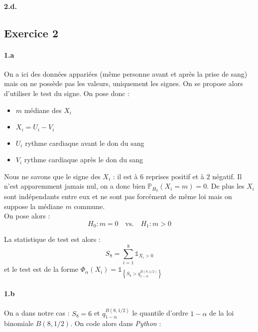 \documentclass[a4paper,10pt]{report}
\begin{document}

\paragraph{2.d.} %






\subsection*{Exercice 2}


\paragraph{1.a} On a ici des données appariées (même personne avant et après la prise de sang) mais on ne possède pas les valeurs, uniquement les signes. On se propose alors d'utiliser le test du signe. On pose donc :
\begin{itemize}
\item $m$ médiane des $X_i$
\item $X_i = U_i - V_i$
\item $U_i$ rythme cardiaque avant le don du sang
\item $V_i$ rythme cardiaque après le don du sang
\end{itemize}
Nous ne savons que le signe des $X_i$ : il est à $6$ reprises positif et à $2$ négatif. Il n'est apparemment jamais nul, on a donc bien $\mathbb{P}_{H_0}(X_i=m)=0$. De plus les $X_i$ sont indépendants entre eux et ne sont pas forcément de même loi mais on suppose la médiane $m$ commune. \\
On pose alors :
$$
H_0 : m=0 \quad \text{vs.} \quad H_1 : m > 0
$$

La statistique de test est alors :
$$
S_8 = \sum_{i=1}^8 \mathds{1}_{X_i > 0}
$$
et le test est de la forme $\Phi_\alpha(X_i) = \mathds{1}_{\left\{ S_8  > q_{1-\alpha}^{B(8,1/2)}  \right\}}$


\paragraph{1.b} On a dans notre cas : $S_8 = 6$ et $q_{1-\alpha}^{B(8,1/2)} $ le quantile d'ordre $1-\alpha$ de la loi binomiale $B(8,1/2)$. On code alors dans \textit{Python} :
\end{document}
